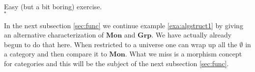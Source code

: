 \begin{prf}
Easy (but a bit boring) exercise.
\\
\phantom{proven}
\hfill
$\square$
\end{prf}
In the next subsection \ref{sec:func} we continue example \ref{exa:algstruct1} by giving an alternative characterization of $\mathbf{Mon}$ and $\mathbf{Grp}$. We have actually already begun to do that here. When restricted to a universe one can wrap up all the $\pmb{\emptyset}$ in a category and then compare it to $\mathbf{Mon}$. What we miss is a morphism concept for categories and this will be the subject of the next subsection \ref{sec:func}.
